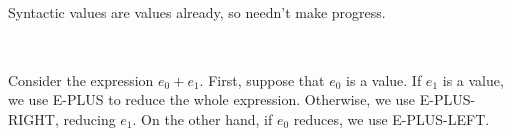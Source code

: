 \documentclass{article}
\begin{document}
\begin{enumerate}
\begin{enumerate}[label=\roman*]
\begin{code}
\\
\>[0]\<[2]%
\>[2] \AgdaSymbol{:}    \AgdaSymbol{\}} \<%
\\
\>[2]\<[9]%
\>[9]                       \<%
\\
%
\\
\> \AgdaSymbol{:}  \AgdaSymbol{\}}                 \AgdaSymbol{)}\<%
\end{code}

    Syntactic values are values already, so needn't make progress.

    \begin{code}%
\> \AgdaSymbol{(} \AgdaSymbol{)} \AgdaSymbol{=}  \<%
\\
\> \AgdaSymbol{(} \AgdaSymbol{)} \AgdaSymbol{=}  \<%
\end{code}

    Consider the expression $e_0 + e_1$. First, suppose that $e_0$ is a value. If $e_1$ is a value, we use E-PLUS to reduce the whole expression. Otherwise, we use E-PLUS-RIGHT, reducing $e_1$. On the other hand, if $e_0$ reduces, we use E-PLUS-LEFT.


\end{enumerate}
\end{enumerate}
\end{document}
